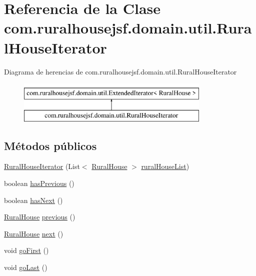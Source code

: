 \hypertarget{classcom_1_1ruralhousejsf_1_1domain_1_1util_1_1_rural_house_iterator}{}\section{Referencia de la Clase com.\+ruralhousejsf.\+domain.\+util.\+Rural\+House\+Iterator}
\label{classcom_1_1ruralhousejsf_1_1domain_1_1util_1_1_rural_house_iterator}
Diagrama de herencias de com.\+ruralhousejsf.\+domain.\+util.\+Rural\+House\+Iterator\begin{figure}[H]
\begin{center}
\leavevmode
\includegraphics[height=2.000000cm]{d6/d29/classcom_1_1ruralhousejsf_1_1domain_1_1util_1_1_rural_house_iterator}
\end{center}
\end{figure}
\subsection*{Métodos públicos}
\begin{DoxyCompactItemize}
\item 
\mbox{\hyperlink{classcom_1_1ruralhousejsf_1_1domain_1_1util_1_1_rural_house_iterator_aa0a65be50d1149a49a37203d411279d3}{Rural\+House\+Iterator}} (List$<$ \mbox{\hyperlink{classcom_1_1ruralhousejsf_1_1domain_1_1_rural_house}{Rural\+House}} $>$ \mbox{\hyperlink{classcom_1_1ruralhousejsf_1_1domain_1_1util_1_1_rural_house_iterator_a86506cdc509d2a232309bdcf939f4d51}{rural\+House\+List}})
\item 
boolean \mbox{\hyperlink{classcom_1_1ruralhousejsf_1_1domain_1_1util_1_1_rural_house_iterator_a90b778a08dfc34d566860a169a3001b9}{has\+Previous}} ()
\item 
boolean \mbox{\hyperlink{classcom_1_1ruralhousejsf_1_1domain_1_1util_1_1_rural_house_iterator_a9c16d216cbe652522d6c903294938eda}{has\+Next}} ()
\item 
\mbox{\hyperlink{classcom_1_1ruralhousejsf_1_1domain_1_1_rural_house}{Rural\+House}} \mbox{\hyperlink{classcom_1_1ruralhousejsf_1_1domain_1_1util_1_1_rural_house_iterator_af8df4b4ec1f3a626dbda91cf23daeb08}{previous}} ()
\item 
\mbox{\hyperlink{classcom_1_1ruralhousejsf_1_1domain_1_1_rural_house}{Rural\+House}} \mbox{\hyperlink{classcom_1_1ruralhousejsf_1_1domain_1_1util_1_1_rural_house_iterator_ad3bcb60befad58cc8bd1377459ae729b}{next}} ()
\item 
void \mbox{\hyperlink{classcom_1_1ruralhousejsf_1_1domain_1_1util_1_1_rural_house_iterator_a843246b6edfb1409f7fe9afc1215bc31}{go\+First}} ()
\item 
void \mbox{\hyperlink{classcom_1_1ruralhousejsf_1_1domain_1_1util_1_1_rural_house_iterator_a58fe2a76236f3578ff3eb7f22b14bc5c}{go\+Last}} ()
\end{DoxyCompactItemize}
